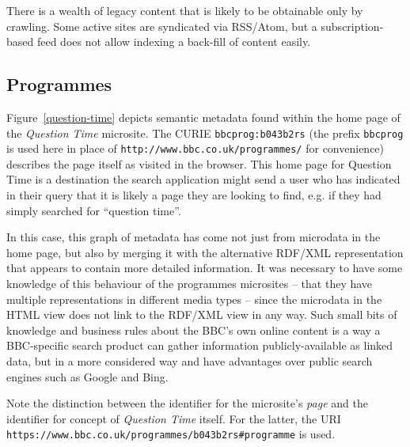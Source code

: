 There is a wealth of legacy content that is likely to be obtainable only by
crawling. Some active sites are syndicated via RSS/Atom, but a subscription-based
feed does not allow indexing a back-fill of content easily.

\subsection{Programmes}
\label{programmes}

Figure~\ref{question-time} depicts semantic metadata found within the home page
of the \emph{Question Time} microsite. The CURIE\cite{birbeck2009curie}
\texttt{bbcprog:b043b2rs} (the prefix \texttt{bbcprog} is used here in place
of \texttt{http://www.bbc.co.uk/programmes/} for convenience)
describes the page itself as visited in the
browser. This home page for Question Time is a destination the search
application might send a user who has indicated in their query that it
is likely a page they are looking to find, e.g. if they had simply
searched for ``question time''.

In this case, this graph of metadata has come not just from microdata
in the home page, but also by merging it with the alternative RDF/XML
representation that appears to contain more detailed information.
It was necessary to have some knowledge of this behaviour of the
programmes microsites -- that they have multiple representations
in different media types -- since the microdata in the HTML view
does not link to the RDF/XML view in any way. Such small bits of
knowledge and business rules about the BBC's own online content
is a way a BBC-specific search product can gather information publicly-available
as linked data, but in a more considered way and have advantages over
public search engines such as Google and Bing.

\begin{sidewaysfigure}
  \begin{center}
  \end{center}
  \caption{Semantic metadata found within \emph{Question Time} home page}
  \label{question-time}
\end{sidewaysfigure}

Note the distinction between the identifier for the microsite's
\emph{page} and the identifier for concept of \emph{Question Time}
itself. For the latter, the URI
\texttt{https://www.bbc.co.uk/programmes/b043b2rs\#programme}
is used.\cite{raimond2010use}

